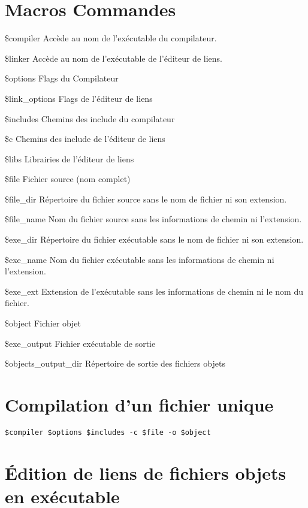 \section{Macros Commandes}\label{sec:command_macros}

\begin{codeentry}
\item[\$compiler] Accède au nom de l'exécutable du compilateur.
\item[\$linker] Accède au nom de l'exécutable de l'éditeur de liens.
\item[\$options] Flags du Compilateur
\item[\$link\_options] Flags de l'éditeur de liens
\item[\$includes] Chemins des include du compilateur
\item[\$c] Chemins des include de l'éditeur de liens
\item[\$libs] Librairies de l'éditeur de liens
\item[\$file] Fichier source (nom complet)
\item[\$file\_dir] Répertoire du fichier source sans le nom de fichier ni son extension.
\item[\$file\_name] Nom du fichier source sans les informations de chemin ni l'extension.
\item[\$exe\_dir] Répertoire du fichier exécutable sans le nom de fichier ni son extension.
\item[\$exe\_name] Nom du fichier exécutable sans les informations de chemin ni l'extension.
\item[\$exe\_ext] Extension de l'exécutable sans les informations de chemin ni le nom du fichier.
\item[\$object] Fichier objet
\item[\$exe\_output] Fichier exécutable de sortie
\item[\$objects\_output\_dir] Répertoire de sortie des fichiers objets
\end{codeentry}

\section{Compilation d'un fichier unique}

\begin{lstlisting}
$compiler $options $includes -c $file -o $object
\end{lstlisting}

\section{Édition de liens de fichiers objets en exécutable}


